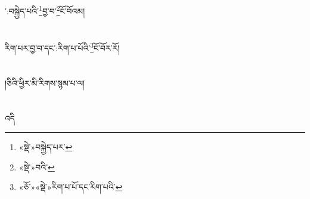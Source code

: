 ་:བསྐྱེད་པའི་\footnote{«སྡེ་»བསྐྱེད་པར་}བྱ་བ་\footnote{«སྡེ་»བའི་}ངོ་བོའམ།\chapter{ }རིག་པར་བྱ་བ་དང་:རིག་པ་པོའི་\footnote{«ཅོ་»«སྡེ་»རིག་པ་པོ་དང་རིག་པའི་}ངོ་བོར་རོ།\chapter{ }།ཅིའི་ཕྱིར་མི་རིགས་སྙམ་པ་ལ།\chapter{ }འདི